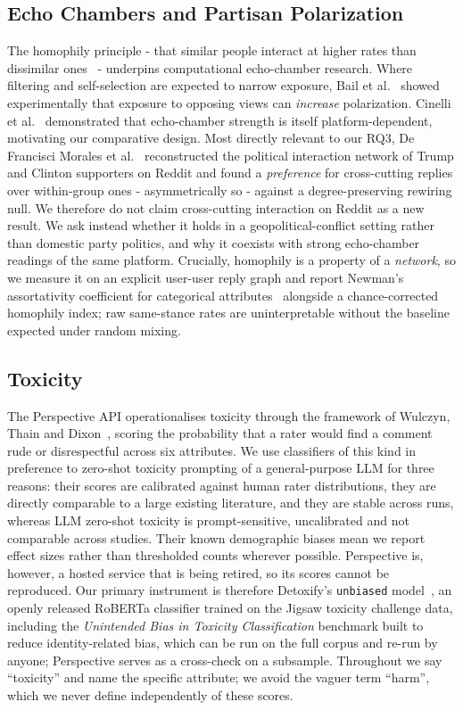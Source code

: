 \documentclass[pdflatex,sn-basic,Numbered,iicol]{sn-jnl}
\begin{document}
\subsection{Echo Chambers and Partisan Polarization}
The homophily principle - that similar people interact at higher rates than
dissimilar ones~\cite{newman2003} - underpins computational echo-chamber
research. Where filtering and self-selection are expected to narrow exposure,
Bail et al.~\cite{bail2018} showed experimentally that
exposure to opposing views can \emph{increase} polarization. Cinelli
et al.~\cite{cinelli2021} demonstrated that echo-chamber strength is itself
platform-dependent, motivating our comparative design. Most directly relevant to
our RQ3, De Francisci Morales et al.~\cite{defrancisci2021} reconstructed the
political interaction network of Trump and Clinton supporters on Reddit and found a
\emph{preference} for cross-cutting replies over within-group ones - asymmetrically
so - against a degree-preserving rewiring null. We therefore do not claim
cross-cutting interaction on Reddit as a new result. We ask instead whether it holds
in a geopolitical-conflict setting rather than domestic party politics, and why it
coexists with strong echo-chamber readings of the same platform. Crucially, homophily is a
property of a \emph{network}, so we measure it on an explicit user-user reply graph
and report Newman's assortativity coefficient for categorical
attributes~\cite{newman2003} alongside a chance-corrected homophily index; raw
same-stance rates are uninterpretable without the baseline expected under random
mixing.

\subsection{Toxicity}
The Perspective API operationalises toxicity through the framework of Wulczyn,
Thain and Dixon~\cite{wulczyn2017}, scoring the probability that a rater would find a
comment rude or disrespectful across six attributes. We use classifiers of this
kind in preference to zero-shot toxicity prompting of a general-purpose LLM for three
reasons: their scores are calibrated against human rater distributions, they are
directly comparable to a large existing literature, and they are stable across runs,
whereas LLM zero-shot toxicity is prompt-sensitive, uncalibrated and not comparable
across studies. Their known demographic biases mean we report effect sizes rather than
thresholded counts wherever possible. Perspective is, however, a hosted service that
is being retired, so its scores cannot be reproduced. Our primary instrument is
therefore Detoxify's \texttt{unbiased} model~\cite{detoxify2020}, an openly
released RoBERTa classifier trained on the Jigsaw toxicity challenge data,
including the \emph{Unintended Bias in Toxicity Classification} benchmark built to
reduce identity-related bias, which can be run on the full corpus and re-run by
anyone; Perspective serves as a cross-check
on a subsample. Throughout we say ``toxicity'' and name the specific attribute; we
avoid the vaguer term ``harm'', which we never define independently of these
scores.
\end{document}
